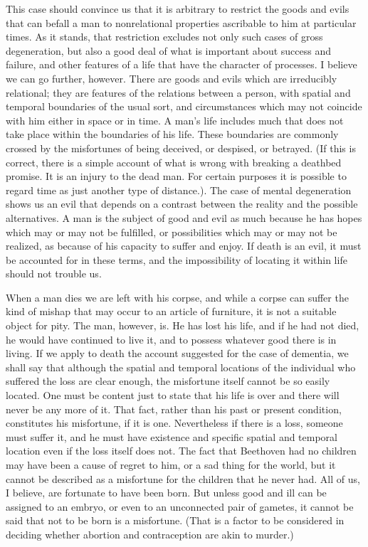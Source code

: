 This case should convince us that it is arbitrary to restrict the goods and evils
that can befall a man to nonrelational properties ascribable to him at particular
times. As it stands, that restriction excludes not only such cases of gross
degeneration, but also a good deal of what is important about success and
failure, and other features of a life that have the character of processes. I
believe we can go further, however. There are goods and evils which are
irreducibly relational; they are features of the relations between a person, with
spatial and temporal boundaries of the usual sort, and circumstances which
may not coincide with him either in space or in time. A man's life includes much
that does not take place within the boundaries of his life. These boundaries are
commonly crossed by the misfortunes of being deceived, or despised, or
betrayed. (If this is correct, there is a simple account of what is wrong with
breaking a deathbed promise. It is an injury to the dead man. For certain
purposes it is possible to regard time as just another type of distance.). The
case of mental degeneration shows us an evil that depends on a contrast
between the reality and the possible alternatives. A man is the subject of good
and evil as much because he has hopes which may or may not be fulfilled, or
possibilities which may or may not be realized, as because of his capacity to
suffer and enjoy. If death is an evil, it must be accounted for in these terms,
and the impossibility of locating it within life should not trouble us.

When a man dies we are left with his corpse, and while a corpse can suffer the
kind of mishap that may occur to an article of furniture, it is not a suitable object
for pity. The man, however, is. He has lost his life, and if he had not died, he
would have continued to live it, and to possess whatever good there is in living.
If we apply to death the account suggested for the case of dementia, we shall
say that although the spatial and temporal locations of the individual who
suffered the loss are clear enough, the misfortune itself cannot be so easily
located. One must be content just to state that his life is over and there will
never be any more of it. That fact, rather than his past or present condition,
constitutes his misfortune, if it is one. Nevertheless if there is a loss, someone
must suffer it, and he must have existence and specific spatial and temporal
location even if the loss itself does not. The fact that Beethoven had no children
may have been a cause of regret to him, or a sad thing for the world, but it
cannot be described as a misfortune for the children that he never had. All of
us, I believe, are fortunate to have been born. But unless good and ill can be
assigned to an embryo, or even to an unconnected pair of gametes, it cannot
be said that not to be born is a misfortune. (That is a factor to be considered in
deciding whether abortion and contraception are akin to murder.)

